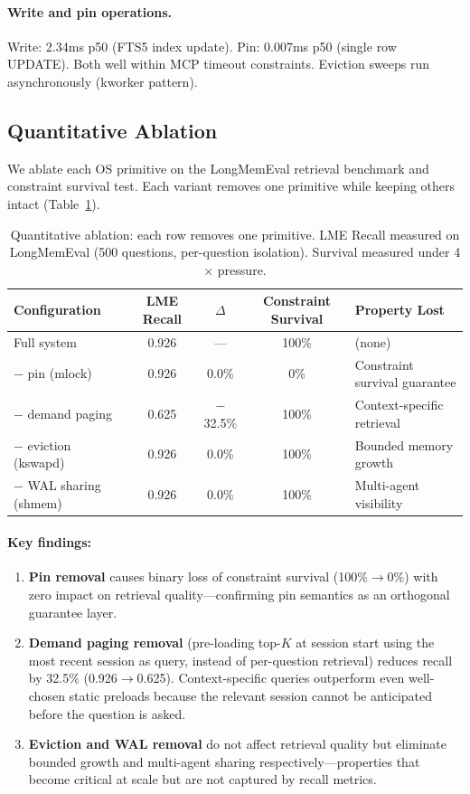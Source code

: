 \documentclass[10pt,twocolumn]{article}
\begin{document}
\paragraph{Write and pin operations.} Write: 2.34ms p50 (FTS5 index update). Pin: 0.007ms p50 (single row UPDATE). Both well within MCP timeout constraints. Eviction sweeps run asynchronously (kworker pattern).

\subsection{Quantitative Ablation}

We ablate each OS primitive on the LongMemEval retrieval benchmark and constraint survival test. Each variant removes one primitive while keeping others intact (Table~\ref{tab:ablation}).

\begin{table}[t]
\centering
\caption{Quantitative ablation: each row removes one primitive. LME Recall measured on LongMemEval (500 questions, per-question isolation). Survival measured under 4$\times$ pressure.}
\label{tab:ablation}
\small
\begin{tabular}{lcccl}
\toprule
Configuration & LME Recall & $\Delta$ & Constraint Survival & Property Lost \\
\midrule
Full system              & 0.926 & ---    & 100\% & (none) \\
$-$ pin (mlock)          & 0.926 & 0.0\%  & 0\%   & Constraint survival guarantee \\
$-$ demand paging        & 0.625 & $-$32.5\% & 100\% & Context-specific retrieval \\
$-$ eviction (kswapd)    & 0.926 & 0.0\%  & 100\% & Bounded memory growth \\
$-$ WAL sharing (shmem)  & 0.926 & 0.0\%  & 100\% & Multi-agent visibility \\
\bottomrule
\end{tabular}
\end{table}

\paragraph{Key findings:}
\begin{enumerate}[leftmargin=*,nosep]
  \item \textbf{Pin removal} causes binary loss of constraint survival (100\%$\to$0\%) with zero impact on retrieval quality---confirming pin semantics as an orthogonal guarantee layer.
  \item \textbf{Demand paging removal} (pre-loading top-$K$ at session start using the most recent session as query, instead of per-question retrieval) reduces recall by 32.5\% (0.926$\to$0.625). Context-specific queries outperform even well-chosen static preloads because the relevant session cannot be anticipated before the question is asked.
  \item \textbf{Eviction and WAL removal} do not affect retrieval quality but eliminate bounded growth and multi-agent sharing respectively---properties that become critical at scale but are not captured by recall metrics.
\end{enumerate}
\end{document}
